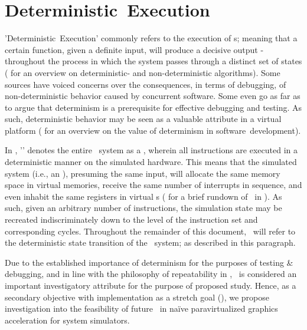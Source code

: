 \section{Deterministic~Execution}
\label{sec:researchquestions_deterministicexecution}
'Deterministic~Execution' commonly refers to the execution of \termdetalg s; meaning that a certain function, given a definite input, will produce a decisive output - throughout the process in which the system passes through a distinct set of states ( for an overview on deterministic- and non-deterministic algorithms).
Some sources have voiced concerns over the consequences, in terms of debugging, of non-deterministic behavior caused by concurrent software.
Some even go as far as to argue that determinism is a prerequisite for effective debugging and testing.
As such, deterministic behavior may be seen as a valuable attribute in a virtual platform ( for an overview on the value of determinism in software~development).

In \termsimics , '\termdetexe ' denotes the entire \termtarget\ system as a \termdetalg , wherein all instructions are executed in a deterministic manner on the simulated hardware.
This means that the simulated system (i.e., an \termos ), presuming the same input, will allocate the same memory space in virtual memories, receive the same number of interrupts in sequence, and even inhabit the same registers in virtual \termcpu s ( for a brief rundown of \termdetexe\ in \termsimics ).
As such, given an arbitrary number of instructions, the simulation state may be recreated indiscriminately down to the level of the instruction set and corresponding cycles.
Throughout the remainder of this document, \termdetexe\ will refer to the deterministic state transition of the \termtarget\ system; as described in this paragraph.

Due to the established importance of determinism for the purposes of testing \& debugging, and in line with the philosophy of repeatability in \termsimics {}, \termdetexe\ is considered an important investigatory attribute for the purpose of proposed study.
Hence, as a secondary objective with implementation as a stretch goal (), we propose investigation into the feasibility of future \termdetexe\ in naïve paravirtualized graphics acceleration for system simulators.

